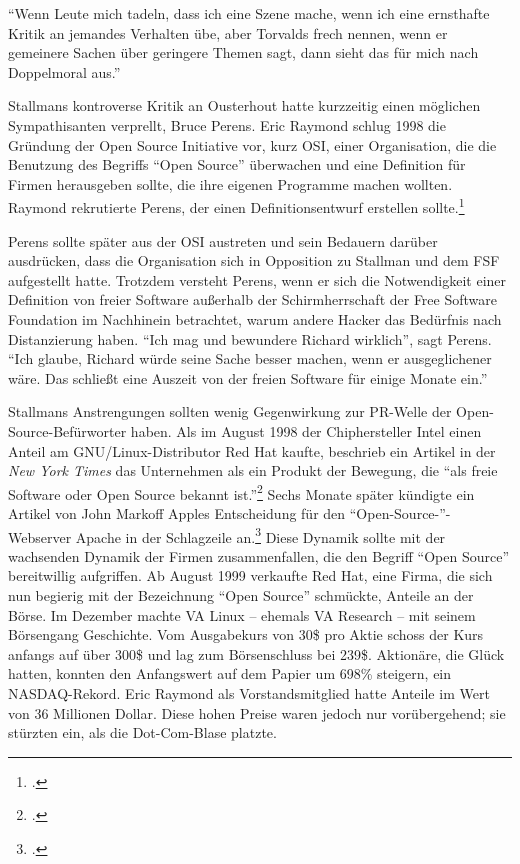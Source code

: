"`Wenn Leute mich tadeln, dass ich \glq eine Szene mache\grq, wenn ich eine ernsthafte Kritik an jemandes Verhalten übe, aber Torvalds \glq frech\grq{} nennen, wenn er gemeinere Sachen über geringere Themen sagt, dann sieht das für mich nach Doppelmoral aus."'


Stallmans kontroverse Kritik an Ousterhout hatte kurzzeitig einen möglichen Sympathisanten verprellt, Bruce Perens. Eric Raymond schlug 1998 die Gründung der Open Source Initiative vor, kurz OSI, einer Organisation, die die Benutzung des Begriffs "`Open Source"' überwachen und eine Definition für Firmen herausgeben sollte, die ihre eigenen Programme machen wollten. Raymond rekrutierte Perens, der einen Definitionsentwurf erstellen sollte.\footcite[][]{osdef}

Perens sollte später aus der OSI austreten und sein Bedauern darüber ausdrücken, dass die Organisation sich in Opposition zu Stallman und dem FSF aufgestellt hatte.
Trotzdem versteht Perens, wenn er sich die Notwendigkeit einer Definition von freier Software außerhalb der Schirmherrschaft der Free Software Foundation im Nachhinein betrachtet, warum andere Hacker das Bedürfnis nach Distanzierung haben. "`Ich mag und bewundere Richard wirklich"', sagt Perens. "`Ich glaube, Richard würde seine Sache besser machen, wenn er ausgeglichener wäre. Das schließt eine Auszeit von der freien Software für einige Monate ein."'

Stallmans Anstrengungen sollten wenig Gegenwirkung zur PR-Welle der Open-Source-Befürworter haben. Als im August 1998 der Chiphersteller Intel einen Anteil am GNU/Linux-Distributor Red Hat kaufte, beschrieb ein Artikel in der \textit{New York Times} das Unternehmen als ein Produkt der Bewegung, die "`als freie Software oder Open Source bekannt ist."'\footcite[][]{forsale} Sechs Monate später kündigte ein Artikel von John Markoff Apples Entscheidung für den "`Open-Source-"'-Webserver Apache in der Schlagzeile an.\footcite[][]{appleado} Diese Dynamik sollte mit der wachsenden Dynamik der Firmen zusammenfallen, die den Begriff "`Open Source"' bereitwillig aufgriffen. Ab August 1999 verkaufte Red Hat, eine Firma, die sich nun begierig mit der Bezeichnung "`Open Source"' schmückte, Anteile an der Börse. Im Dezember machte VA Linux – ehemals VA Research – mit seinem Börsengang Geschichte. Vom Ausgabekurs von 30\$ pro Aktie schoss der Kurs anfangs auf über 300\$ und lag zum Börsenschluss bei 239\$. Aktionäre, die Glück hatten, konnten den Anfangswert auf dem Papier um 698\% steigern, ein NASDAQ-Rekord.
Eric Raymond als Vorstandsmitglied hatte Anteile im Wert von 36 Millionen Dollar. Diese hohen Preise waren jedoch nur vorübergehend; sie stürzten ein, als die Dot-Com-Blase platzte.

